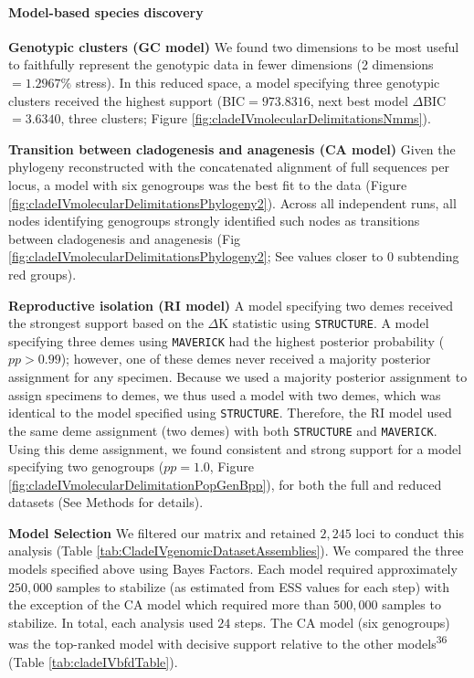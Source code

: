 \documentclass[
  11pt,
]{article}
\begin{document}
\hypertarget{model-based-species-discovery-7}{%
\paragraph{Model-based species discovery}\label{model-based-species-discovery-7}}

\textbf{Genotypic clusters (GC model)} We found two dimensions to be most useful to faithfully represent the genotypic data in fewer dimensions (2 dimensions \(= 1.2967\%\) stress). In this reduced space, a model specifying three genotypic clusters received the highest support (BIC\(=973.8316\), next best model \(\Delta\)BIC\(=3.6340\), three clusters; Figure \ref{fig:cladeIVmolecularDelimitationsNmms}).

\textbf{Transition between cladogenesis and anagenesis (CA model)} Given the phylogeny reconstructed with the concatenated alignment of full sequences per locus, a model with six genogroups was the best fit to the data (Figure \ref{fig:cladeIVmolecularDelimitationsPhylogeny2}). Across all independent runs, all nodes identifying genogroups strongly identified such nodes as transitions between cladogenesis and anagenesis (Fig \ref{fig:cladeIVmolecularDelimitationsPhylogeny2}; See values closer to \(0\) subtending red groups).

\textbf{Reproductive isolation (RI model)} A model specifying two demes received the strongest support based on the \(\Delta\)K statistic using \texttt{STRUCTURE}. A model specifying three demes using \texttt{MAVERICK} had the highest posterior probability (\(pp>0.99\)); however, one of these demes never received a majority posterior assignment for any specimen. Because we used a majority posterior assignment to assign specimens to demes, we thus used a model with two demes, which was identical to the model specified using \texttt{STRUCTURE}. Therefore, the RI model used the same deme assignment (two demes) with both \texttt{STRUCTURE} and \texttt{MAVERICK}. Using this deme assignment, we found consistent and strong support for a model specifying two genogroups (\(pp=1.0\), Figure \ref{fig:cladeIVmolecularDelimitationPopGenBpp}), for both the full and reduced datasets (See Methods for details).

\textbf{Model Selection} We filtered our matrix and retained \(2,245\) loci to conduct this analysis (Table \ref{tab:CladeIVgenomicDatasetAssemblies}). We compared the three models specified above using Bayes Factors. Each model required approximately \(250,000\) samples to stabilize (as estimated from ESS values for each step) with the exception of the CA model which required more than \(500,000\) samples to stabilize. In total, each analysis used \(24\) steps. The CA model (six genogroups) was the top-ranked model with decisive support relative to the other models\textsuperscript{36} (Table \ref{tab:cladeIVbfdTable}).
\end{document}
